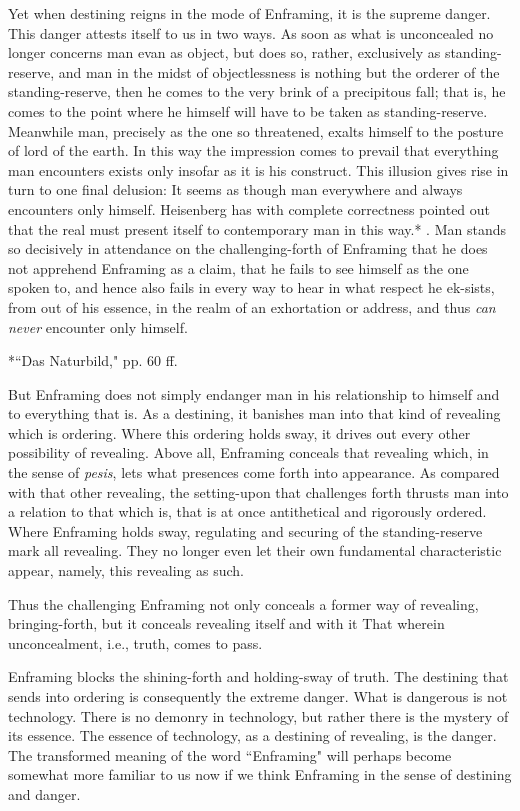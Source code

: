 Yet when destining reigns in the mode of Enframing, it is the supreme danger. This danger attests itself to us in two ways. As soon as what is unconcealed no longer concerns man evan as object, but does so, rather, exclusively as standing-reserve, and man in the midst of objectlessness is nothing but the orderer of the standing-reserve, then he comes to the very brink of a precipitous fall; that is, he comes to the point where he himself will have to be taken as standing-reserve. Meanwhile man, precisely as the one so threatened, exalts himself to the posture of lord of the earth. In this way the impression comes to prevail that everything man encounters exists only insofar as it is his construct. This illusion gives rise in turn to one final delusion: It seems as though man everywhere and always encounters only himself. Heisenberg has with complete correctness pointed out that the real must present itself to contemporary man in this way.* . Man stands so decisively in attendance on the challenging-forth of Enframing that he does not apprehend Enframing as a claim, that he fails to see himself as the one spoken to, and hence also fails in every way to hear in what respect he ek-sists, from out of his essence, in the realm of an exhortation or address, and thus \textit{can never} encounter only himself.

*``Das Naturbild," pp. 60 ff.

But Enframing does not simply endanger man in his relationship to himself and to everything that is. As a destining, it banishes man into that kind of revealing which is ordering. Where this ordering holds sway, it drives out every other possibility of revealing. Above all, Enframing conceals that revealing which, in the sense of \textit{pesis}, lets what presences come forth into appearance. As compared with that other revealing, the setting-upon that challenges forth thrusts man into a relation to that which is, that is at once antithetical and rigorously ordered. Where Enframing holds sway, regulating and securing of the standing-reserve mark all revealing. They no longer even let their own fundamental characteristic appear, namely, this revealing as such.

Thus the challenging Enframing not only conceals a former way of revealing, bringing-forth, but it conceals revealing itself and with it That wherein unconcealment, i.e., truth, comes to pass.

Enframing blocks the shining-forth and holding-sway of truth. The destining that sends into ordering is consequently the extreme danger. What is dangerous is not technology. There is no demonry in technology, but rather there is the mystery of its essence. The essence of technology, as a destining of revealing, is the danger. The transformed meaning of the word ``Enframing" will perhaps become somewhat more familiar to us now if we think Enframing in the sense of destining and danger.

